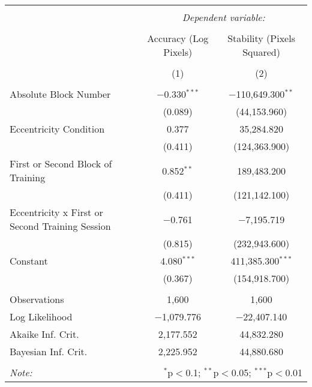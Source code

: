
\begin{table}[!htbp] \centering 
  \caption{} 
  \label{} 
\begin{tabular}{@{\extracolsep{5pt}}lcc} 
\\[-1.8ex]\hline 
\hline \\[-1.8ex] 
 & \multicolumn{2}{c}{\textit{Dependent variable:}} \\ 
\cline{2-3} 
\\[-1.8ex] & Accuracy (Log Pixels) & Stability (Pixels Squared) \\ 
\\[-1.8ex] & (1) & (2)\\ 
\hline \\[-1.8ex] 
 Absolute Block Number & $-$0.330$^{***}$ & $-$110,649.300$^{**}$ \\ 
  & (0.089) & (44,153.960) \\ 
  Eccentricity Condition & 0.377 & 35,284.820 \\ 
  & (0.411) & (124,363.900) \\ 
  First or Second Block of Training & 0.852$^{**}$ & 189,483.200 \\ 
  & (0.411) & (121,142.100) \\ 
  Eccentricity x First or Second Training Session & $-$0.761 & $-$7,195.719 \\ 
  & (0.815) & (232,943.600) \\ 
  Constant & 4.080$^{***}$ & 411,385.300$^{***}$ \\ 
  & (0.367) & (154,918.700) \\ 
 \hline \\[-1.8ex] 
Observations & 1,600 & 1,600 \\ 
Log Likelihood & $-$1,079.776 & $-$22,407.140 \\ 
Akaike Inf. Crit. & 2,177.552 & 44,832.280 \\ 
Bayesian Inf. Crit. & 2,225.952 & 44,880.680 \\ 
\hline 
\hline \\[-1.8ex] 
\textit{Note:}  & \multicolumn{2}{r}{$^{*}$p$<$0.1; $^{**}$p$<$0.05; $^{***}$p$<$0.01} \\ 
\end{tabular} 
\end{table} 
